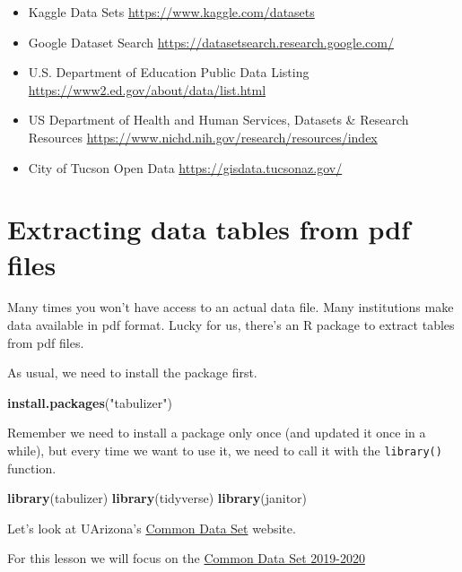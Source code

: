 \documentclass[
]{book}
\newenvironment{Shaded}{\begin{snugshade}}{\end{snugshade}}
\newcommand{\KeywordTok}[1]{\textcolor[rgb]{0.13,0.29,0.53}{\textbf{#1}}}
\newcommand{\NormalTok}[1]{#1}
\newcommand{\StringTok}[1]{\textcolor[rgb]{0.31,0.60,0.02}{#1}}
\begin{document}
\begin{itemize}
\item
  Kaggle Data Sets \url{https://www.kaggle.com/datasets}
\item
  Google Dataset Search \url{https://datasetsearch.research.google.com/}
\item
  U.S. Department of Education Public Data Listing \url{https://www2.ed.gov/about/data/list.html}
\item
  US Department of Health and Human Services, Datasets \& Research Resources \url{https://www.nichd.nih.gov/research/resources/index}
\item
  City of Tucson Open Data \url{https://gisdata.tucsonaz.gov/}
\end{itemize}

\hypertarget{extracting-data-tables-from-pdf-files}{%
\section{Extracting data tables from pdf files}\label{extracting-data-tables-from-pdf-files}}

Many times you won't have access to an actual data file. Many institutions make data available in pdf format. Lucky for us, there's an R package to extract tables from pdf files.

As usual, we need to install the package first.

\begin{Shaded}
\begin{Highlighting}[]
\KeywordTok{install.packages}\NormalTok{(}\StringTok{"tabulizer"}\NormalTok{)}
\end{Highlighting}
\end{Shaded}

Remember we need to install a package only once (and updated it once in a while), but every time we want to use it, we need to call it with the \texttt{library()} function.

\begin{Shaded}
\begin{Highlighting}[]
\KeywordTok{library}\NormalTok{(tabulizer)}
\KeywordTok{library}\NormalTok{(tidyverse)}
\KeywordTok{library}\NormalTok{(janitor)}
\end{Highlighting}
\end{Shaded}

Let's look at UArizona's \href{https://uair.arizona.edu/CommonDataSet}{Common Data Set} website.

For this lesson we will focus on the \href{https://uair.arizona.edu/sites/default/files/2019-2020\%20CDS_FINAL_060820.pdf}{Common Data Set 2019-2020}
\end{document}
